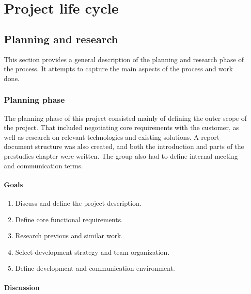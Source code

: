 
\chapter{Project life cycle}
\label{ch:project_lifecycle}

\section{Planning and research}
\label{sec:project_lifecycle-planning_and_research}

This section provides a general description of the planning and research phase of the process. It attempts to capture the main aspects of the process and work done.

\subsection{Planning phase}
\label{subsec:project_lifecycle-planning_and_research-planning_phase}

The planning phase of this project consisted mainly of defining the outer scope of the project. That included negotiating core requirements with the customer, as well as research on relevant technologies and existing solutions. A report document structure was also created, and both the introduction and parts of the prestudies chapter were written. The group also had to define internal meeting and communication terms.

\subsubsection{Goals}
\label{subsec:project_lifecycle-planning_and_research-planning_phase-goals}

\begin{enumerate}
\item Discuss and define the project description.
\item Define core functional requirements.
\item Research previous and similar work.
\item Select development strategy and team organization.
\item Define development and communication environment.
\end{enumerate}

\subsubsection{Discussion}
\label{subsec:project_lifecycle-planning_and_research-planning_phase-discussion}


